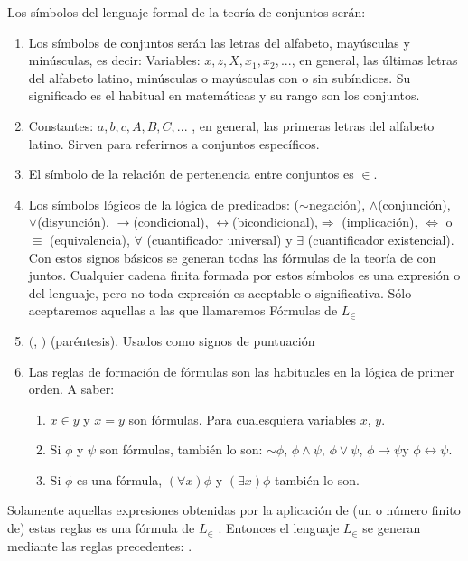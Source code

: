 Los símbolos del lenguaje formal de la teoría de conjuntos serán:
\begin{enumerate}
\item Los símbolos de conjuntos serán las letras del alfabeto, mayúsculas
y minúsculas, es decir: \phantom{xxxxxxxxxxxxxxxxxxxxxxx}\phantom{xxxxmmmmmmmmmmmmmmmmmmmm}
Variables: $x,z,X,x_{1},x_{2},...$, en general, las últimas letras
del alfabeto latino, minúsculas o mayúsculas con o sin subíndices.
Su significado es el habitual en matemáticas y su rango son los conjuntos.
\item Constantes: $a,b,c,A,B,C,...$ , en general, las primeras letras del
alfabeto latino. Sirven para referirnos a conjuntos específicos.
\item El símbolo de la relación de pertenencia entre conjuntos es $\in$.
\item Los símbolos lógicos de la lógica de predicados: ($\sim$negación),
$\wedge$(conjunción), $\vee$(disyunción), $\rightarrow$(condicional),
$\leftrightarrow$(bicondicional),$\Rightarrow$ (implicación), $\Leftrightarrow$
o $\equiv$ (equivalencia), $\forall$ (cuantificador universal) y
$\exists$ (cuantificador existencial). Con estos signos básicos se
generan todas las fórmulas de la teoría de con juntos. \medskip{}
Cualquier cadena finita formada por estos símbolos es una expresión
o del lenguaje, pero no toda expresión es aceptable o significativa.
Sólo aceptaremos aquellas a las que llamaremos Fórmulas de $L_{\in}$ 
\item $($, $)$ (paréntesis). Usados como signos de puntuación
\item Las reglas de formación de fórmulas son las habituales en la lógica
de primer orden. A saber:

\begin{enumerate}
\item $x\in y$ y $x=y$ son fórmulas. Para cualesquiera variables $x$,
$y$. 
\item Si  $\phi$ y $\psi$ son fórmulas, también lo son: $\sim\phi$, $\phi\wedge\psi$,
$\phi\vee\psi$, $\phi\rightarrow\psi$y $\phi\leftrightarrow\psi$. 
\item Si $\phi$ es una fórmula, $\left(\forall x\right)\phi$ y $\left(\exists x\right)\phi$
también lo son.
\end{enumerate}
\end{enumerate}
Solamente aquellas expresiones obtenidas por la aplicación de (un
o número finito de) estas reglas es una fórmula de $L_{\in}$ . Entonces
el lenguaje $L_{\in}$ se generan mediante las reglas precedentes:
.

